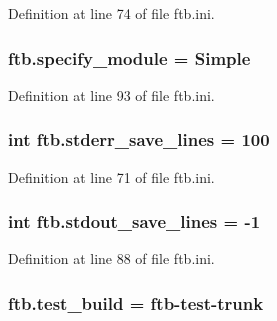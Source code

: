 Definition at line 74 of file ftb.\-ini.

\hypertarget{namespaceftb_addf629fca64be87df63ed74143701d64}{
\subsubsection[{specify\-\_\-module}]{\setlength{\rightskip}{0pt plus 5cm}ftb.\-specify\-\_\-module = Simple}}\label{namespaceftb_addf629fca64be87df63ed74143701d64}


Definition at line 93 of file ftb.\-ini.

\hypertarget{namespaceftb_ae4dc745f3cad7888d7b0ec6f707dd987}{
\subsubsection[{stderr\-\_\-save\-\_\-lines}]{\setlength{\rightskip}{0pt plus 5cm}int ftb.\-stderr\-\_\-save\-\_\-lines = 100}}\label{namespaceftb_ae4dc745f3cad7888d7b0ec6f707dd987}


Definition at line 71 of file ftb.\-ini.

\hypertarget{namespaceftb_a0323281cbf8bed3a87bcf74ffe8a4944}{
\subsubsection[{stdout\-\_\-save\-\_\-lines}]{\setlength{\rightskip}{0pt plus 5cm}int ftb.\-stdout\-\_\-save\-\_\-lines = -\/1}}\label{namespaceftb_a0323281cbf8bed3a87bcf74ffe8a4944}


Definition at line 88 of file ftb.\-ini.

\hypertarget{namespaceftb_a956fe10ace4560b67e71bd1952c74dd3}{
\subsubsection[{test\-\_\-build}]{\setlength{\rightskip}{0pt plus 5cm}ftb.\-test\-\_\-build = ftb-\/test-\/trunk}}\label{namespaceftb_a956fe10ace4560b67e71bd1952c74dd3}



